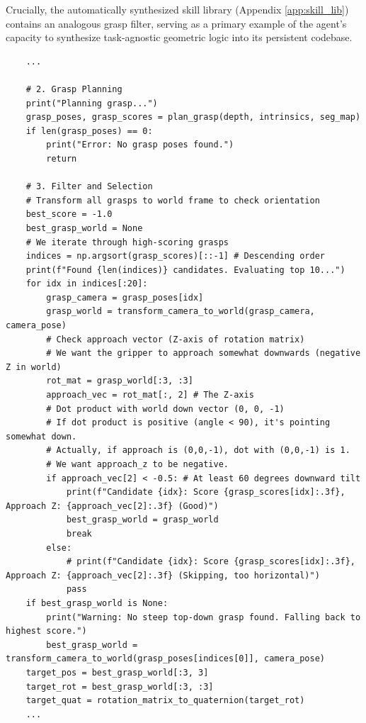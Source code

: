 Crucially, the automatically synthesized skill library (Appendix \ref{app:skill_lib}) contains an analogous grasp filter, serving as a primary example of the agent's capacity to synthesize task-agnostic geometric logic into its persistent codebase.
\begin{lstlisting}
    ...
    
    # 2. Grasp Planning
    print("Planning grasp...")
    grasp_poses, grasp_scores = plan_grasp(depth, intrinsics, seg_map)
    if len(grasp_poses) == 0:
        print("Error: No grasp poses found.")
        return
        
    # 3. Filter and Selection
    # Transform all grasps to world frame to check orientation
    best_score = -1.0
    best_grasp_world = None
    # We iterate through high-scoring grasps
    indices = np.argsort(grasp_scores)[::-1] # Descending order
    print(f"Found {len(indices)} candidates. Evaluating top 10...")
    for idx in indices[:20]:
        grasp_camera = grasp_poses[idx]
        grasp_world = transform_camera_to_world(grasp_camera, camera_pose)
        # Check approach vector (Z-axis of rotation matrix)
        # We want the gripper to approach somewhat downwards (negative Z in world)
        rot_mat = grasp_world[:3, :3]
        approach_vec = rot_mat[:, 2] # The Z-axis
        # Dot product with world down vector (0, 0, -1)
        # If dot product is positive (angle < 90), it's pointing somewhat down.
        # Actually, if approach is (0,0,-1), dot with (0,0,-1) is 1.
        # We want approach_z to be negative.
        if approach_vec[2] < -0.5: # At least 60 degrees downward tilt
            print(f"Candidate {idx}: Score {grasp_scores[idx]:.3f}, Approach Z: {approach_vec[2]:.3f} (Good)")
            best_grasp_world = grasp_world
            break
        else:
            # print(f"Candidate {idx}: Score {grasp_scores[idx]:.3f}, Approach Z: {approach_vec[2]:.3f} (Skipping, too horizontal)")
            pass
    if best_grasp_world is None:
        print("Warning: No steep top-down grasp found. Falling back to highest score.")
        best_grasp_world = transform_camera_to_world(grasp_poses[indices[0]], camera_pose)
    target_pos = best_grasp_world[:3, 3]
    target_rot = best_grasp_world[:3, :3]
    target_quat = rotation_matrix_to_quaternion(target_rot)
    ...
\end{lstlisting}

